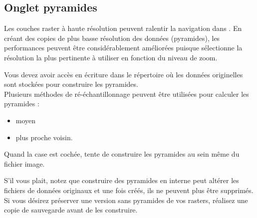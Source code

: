\subsection{Onglet pyramides}\label{raster_pyramids}

Les couches raster à haute résolution peuvent ralentir la navigation dans \qg. En créant des copies de plus basse résolution des données (pyramides), les performances peuvent être considérablement améliorées puisque \qg sélectionne la résolution la plus pertinente à utiliser en fonction du niveau de zoom.


Vous devez avoir accès en écriture dans le répertoire où les données
originelles sont stockées pour construire les pyramides. \\
Plusieurs méthodes de ré-échantillonnage peuvent être utilisées pour calculer les pyramides :
\begin{itemize}[label=--]
\item moyen
\item plus proche voisin.
\end{itemize}

Quand la case  est cochée, \qg tente de construire les pyramides au sein même du fichier image.

S'il vous plait, notez que construire des pyramides en interne peut altérer les fichiers de
données originaux et une fois créés, ils ne peuvent plus être supprimés. Si vous désirez préserver une version sans pyramides de vos rasters, réalisez une copie de sauvegarde avant de les construire.

